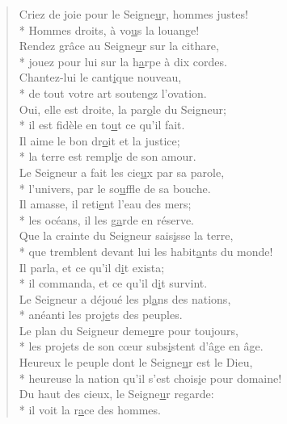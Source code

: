 \begin{verse}
Criez de joie pour le Seigne\underline{u}r, hommes justes! \\*
Hommes droits, à vo\underline{u}s la louange! \\

Rendez grâce au Seigne\underline{u}r sur la cithare, \\*
jouez pour lui sur la h\underline{a}rpe à dix cordes. \\
Chantez-lui le cant\underline{i}que nouveau, \\*
de tout votre art souten\underline{e}z l’ovation. \\

Oui, elle est droite, la par\underline{o}le du Seigneur; \\*
il est fidèle en to\underline{u}t ce qu’il fait. \\
Il aime le bon dr\underline{o}it et la justice; \\*
la terre est rempl\underline{i}e de son amour. \\

Le Seigneur a fait les cie\underline{u}x par sa parole, \\*
l’univers, par le so\underline{u}ffle de sa bouche. \\
Il amasse, il reti\underline{e}nt l’eau des mers; \\*
les océans, il les g\underline{a}rde en réserve. \\

Que la crainte du Seigneur sais\underline{i}sse la terre, \\*
que tremblent devant lui les habit\underline{a}nts du monde! \\
Il parla, et ce qu’il d\underline{i}t exista; \\*
il commanda, et ce qu’il d\underline{i}t survint. \\

Le Seigneur a déjoué les pl\underline{a}ns des nations, \\*
anéanti les proj\underline{e}ts des peuples. \\
Le plan du Seigneur deme\underline{u}re pour toujours, \\*
les projets de son cœur subs\underline{i}stent d’âge en âge. \\

Heureux le peuple dont le Seigne\underline{u}r est le Dieu, \\*
heureuse la nation qu’il s’est chois\underline{i}e pour domaine! \\
Du haut des cieux, le Seigne\underline{u}r regarde: \\*
il voit la r\underline{a}ce des hommes. \\


\end{verse}
